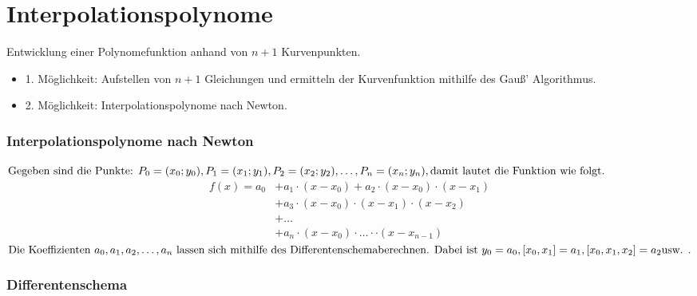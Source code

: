 \section{Interpolationspolynome}
Entwicklung einer Polynomefunktion anhand von \(n+1\) Kurvenpunkten.
\begin{itemize}
 \item 1. Möglichkeit: Aufstellen von $n+1$ Gleichungen und ermitteln der Kurvenfunktion mithilfe des Gauß' Algorithmus.
 \item 2. Möglichkeit: Interpolationspolynome nach Newton.
\end{itemize}

\subsubsection{Interpolationspolynome nach Newton}
\(\text{Gegeben sind die Punkte: } \\ P_0=(x_0;y_0), P_1=(x_1;y_1), P_2=(x_2;y_2), \ldots, P_n=(x_n;y_n), \\ \text{damit lautet die Funktion wie folgt.}\)
\begin{align*}
 f(x)=a_0&+a_1\cdot (x-x_0)+ a_2\cdot (x-x_0)\cdot(x-x_1)\\
	 &+a_3\cdot(x-x_0)\cdot(x-x_1)\cdot(x-x_2)\\
	 &+\ldots\\
	 &+a_n\cdot(x-x_0)\cdot\ldots\cdot\cdot(x-x_{n-1})
\end{align*}
\( \text{Die Koeffizienten } a_0, a_1, a_2,\ldots, a_n \text{ lassen sich mithilfe des Differentenschema} \\ \text{berechnen. Dabei ist } y_0=a_0, [x_0,x_1]=a_1, [x_0,x_1,x_2]=a_2 \text{usw. .}\) 

\subsubsection{Differentenschema}

